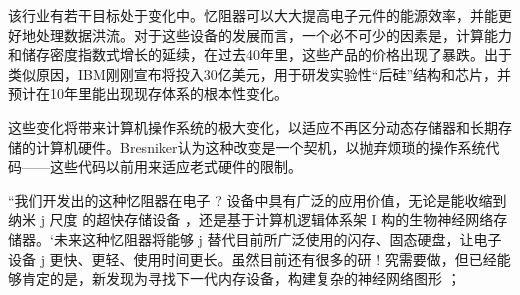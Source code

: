 \documentclass[UTF8]{article}
\begin{document}
该行业有若干目标处于变化中。忆阻器可以大大提高电子元件的能源效率，并能更好地处理数据洪流。对于这些设备的发展而言，一个必不可少的因素是，计算能力和储存密度指数式增长的延续，在过去40年里，这些产品的价格出现了暴跌。出于类似原因，IBM刚刚宣布将投入30亿美元，用于研发实验性“后硅”结构和芯片，并预计在10年里能出现现存体系的根本性变化。

这些变化将带来计算机操作系统的极大变化，以适应不再区分动态存储器和长期存储的计算机硬件。Bresniker认为这种改变是一个契机，以抛弃烦琐的操作系统代码——这些代码以前用来适应老式硬件的限制。

“我们开发出的这种忆阻器在电子 ? 设备中具有广泛的应用价值，无论是能收缩到纳米 j 尺度 的超快存储设备 ，还是基于计算机逻辑体系架 I 构的生物神经网络存储器。‘未来这种忆阻器将能够 j 替代目前所广泛使用的闪存、固态硬盘，让电子设备 j 更快、更轻、使用时间更长。虽然目前还有很多的研 ! 究需要做，但已经能够肯定的是，新发现为寻找下一代内存设备，构建复杂的神经网络图形 ； 
\end{document}
